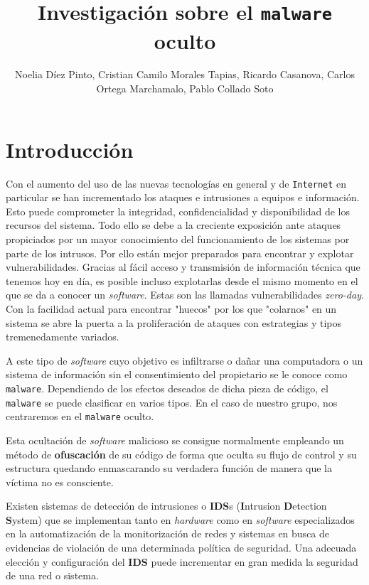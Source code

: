 \documentclass[12pt]{article}
\title{Investigación sobre el \texttt{malware} oculto}
\author{Noelia Díez Pinto, Cristian Camilo Morales Tapias, Ricardo Casanova, Carlos Ortega Marchamalo, Pablo Collado Soto}
\date{}
\newcommand{\newpar} {
    \vskip 1cm
}
\begin{document}
    \begin{titlepage}
        \maketitle
    \end{titlepage}

    \newpage
    \tableofcontents

    \section{Introducción}
        Con el aumento del uso de las nuevas tecnologías en general y de \texttt{Internet} en particular se han incrementado los ataques e intrusiones a equipos e información. Esto puede comprometer la integridad, confidencialidad y disponibilidad de los recursos del sistema. Todo ello se debe a la creciente exposición ante ataques propiciados por un mayor conocimiento del funcionamiento de los sistemas por parte de los intrusos. Por ello están mejor preparados para encontrar y explotar vulnerabilidades. Gracias al fácil acceso y transmisión de información técnica que tenemos hoy en día, es posible incluso explotarlas desde el mismo momento en el que se da a conocer un \textit{software}. Estas son las llamadas vulnerabilidades \textit{zero-day}. Con la facilidad actual para encontrar "huecos" por los que "colarnos" en un sistema se abre la puerta a la proliferación de ataques con estrategias y tipos tremenedamente variados.

        \newpar

        A este tipo de \textit{software} cuyo objetivo es infiltrarse o dañar una computadora o un sistema de información sin el consentimiento del propietario se le conoce como 
        \texttt{malware}. Dependiendo de los efectos deseados de dicha pieza de código, el \texttt{malware} se puede clasificar en varios tipos. En el caso de nuestro grupo, nos centraremos en el \texttt{malware} oculto.

        \newpar

        Esta ocultación de \textit{software} malicioso se consigue normalmente empleando un método de \textbf{ofuscación} de su código de forma que oculta su flujo de control y su estructura quedando enmascarando su verdadera función de manera que la víctima no es consciente.

        \newpar

        Existen sistemas de detección de intrusiones o \textbf{IDS}s (\textbf{I}ntrusion \textbf{D}etection \textbf{S}ystem) que se implementan tanto en \textit{hardware} como en \textit{software} especializados en la automatización de la monitorización de redes y sistemas en busca de evidencias de violación de una determinada política de seguridad. Una adecuada elección y configuración del \textbf{IDS} puede incrementar en gran medida la seguridad de una red o sistema.
\end{document}
